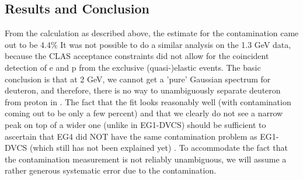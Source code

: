 \subsection{Results and Conclusion}
From the calculation as described above, the estimate for the  contamination came out to be 4.4\% %
It was not possible to do a similar analysis %
on the 1.3 GeV  data, because the CLAS acceptance constraints did not allow for the coincident detection of e and p from the exclusive (quasi-)elastic events. The basic conclusion is that at 2 GeV, we cannot get a 'pure' Gaussian spectrum for deuteron, and therefore, there is no way to unambiguously separate deuteron from proton in . The fact that the fit looks reasonably well (with contamination coming out to be only a few percent) and that we clearly do not see a narrow peak on top of a wider one (unlike in EG1-DVCS) should be sufficient to ascertain that EG4 did NOT have the same contamination problem as EG1-DVCS (which still has not been explained yet) \cite{pComKuhn}. To accommodate the fact that the contamination measurement is not reliably unambiguous, we will assume a rather generous systematic error due to the contamination.



